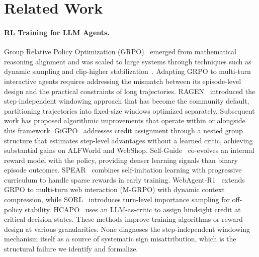 \section{Related Work}
\label{sec:related_work}

\paragraph{RL Training for LLM Agents.}
Group Relative Policy Optimization (GRPO)~\cite{shao2024deepseekmath} emerged from mathematical reasoning alignment and was scaled to large systems through techniques such as dynamic sampling and clip-higher stabilization~\cite{dapo2025}. Adapting GRPO to multi-turn interactive agents requires addressing the mismatch between its episode-level design and the practical constraints of long trajectories. RAGEN~\cite{ragen2025} introduced the step-independent windowing approach that has become the community default, partitioning trajectories into fixed-size windows optimized separately. Subsequent work has proposed algorithmic improvements that operate within or alongside this framework. GiGPO~\cite{feng2025gigpo} addresses credit assignment through a nested group structure that estimates step-level advantages without a learned critic, achieving substantial gains on ALFWorld and WebShop. Self-Guide~\cite{selfguide2026} co-evolves an internal reward model with the policy, providing denser learning signals than binary episode outcomes. SPEAR~\cite{spear2025} combines self-imitation learning with progressive curriculum to handle sparse rewards in early training. WebAgent-R1~\cite{wei2025webagent-r1} extends GRPO to multi-turn web interaction (M-GRPO) with dynamic context compression, while SORL~\cite{li2025sorl} introduces turn-level importance sampling for off-policy stability. HCAPO~\cite{hcapo2026} uses an LLM-as-critic to assign hindsight credit at critical decision states. These methods improve training algorithms or reward design at various granularities. None diagnoses the step-independent windowing mechanism itself as a source of systematic sign misattribution, which is the structural failure we identify and formalize.


